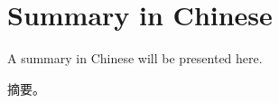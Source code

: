 \chapter*{Summary in Chinese}

\graphicspath{{./ch-x-others/images/}}


\begin{CJK*}{UTF8}{gbsn}
A summary in Chinese will be presented here.

摘要。
\end{CJK*}
